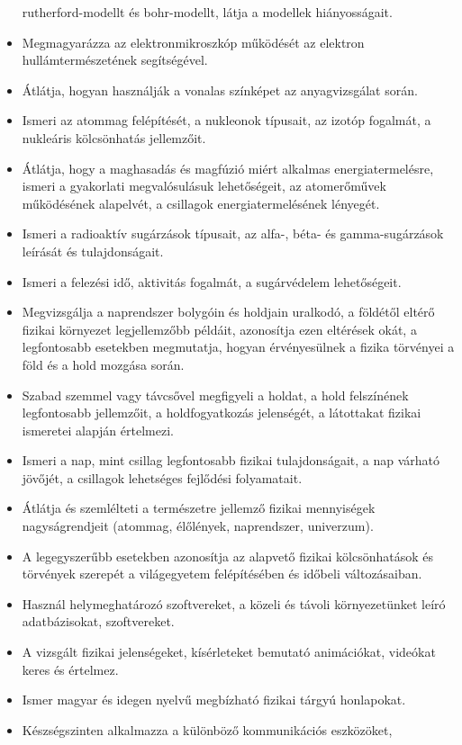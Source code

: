 \begin{itemize}
  rutherford-modellt és bohr-modellt, látja a modellek hiányosságait.
\item
  Megmagyarázza az elektronmikroszkóp működését az elektron
  hullámtermészetének segítségével.
\item
  Átlátja, hogyan használják a vonalas színképet az anyagvizsgálat
  során.
\item
  Ismeri az atommag felépítését, a nukleonok típusait, az izotóp
  fogalmát, a nukleáris kölcsönhatás jellemzőit.
\item
  Átlátja, hogy a maghasadás és magfúzió miért alkalmas
  energiatermelésre, ismeri a gyakorlati megvalósulásuk lehetőségeit, az
  atomerőművek működésének alapelvét, a csillagok energiatermelésének
  lényegét.
\item
  Ismeri a radioaktív sugárzások típusait, az alfa-, béta- és
  gamma-sugárzások leírását és tulajdonságait.
\item
  Ismeri a felezési idő, aktivitás fogalmát, a sugárvédelem
  lehetőségeit.
\item
  Megvizsgálja a naprendszer bolygóin és holdjain uralkodó, a földétől
  eltérő fizikai környezet legjellemzőbb példáit, azonosítja ezen
  eltérések okát, a legfontosabb esetekben megmutatja, hogyan
  érvényesülnek a fizika törvényei a föld és a hold mozgása során.
\item
  Szabad szemmel vagy távcsővel megfigyeli a holdat, a hold felszínének
  legfontosabb jellemzőit, a holdfogyatkozás jelenségét, a látottakat
  fizikai ismeretei alapján értelmezi.
\item
  Ismeri a nap, mint csillag legfontosabb fizikai tulajdonságait, a nap
  várható jövőjét, a csillagok lehetséges fejlődési folyamatait.
\item
  Átlátja és szemlélteti a természetre jellemző fizikai mennyiségek
  nagyságrendjeit (atommag, élőlények, naprendszer, univerzum).
\item
  A legegyszerűbb esetekben azonosítja az alapvető fizikai
  kölcsönhatások és törvények szerepét a világegyetem felépítésében és
  időbeli változásaiban.
\item
  Használ helymeghatározó szoftvereket, a közeli és távoli
  környezetünket leíró adatbázisokat, szoftvereket.
\item
  A vizsgált fizikai jelenségeket, kísérleteket bemutató animációkat,
  videókat keres és értelmez.
\item
  Ismer magyar és idegen nyelvű megbízható fizikai tárgyú honlapokat.
\item
  Készségszinten alkalmazza a különböző kommunikációs eszközöket,

\end{itemize}
